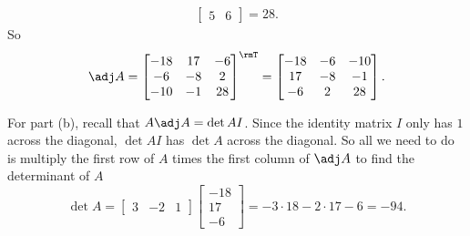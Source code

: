 \begin{questions}
\begin{solution}
\begin{align*}
\begin{bmatrix}
        5&6
      \end{bmatrix}=28.
    \end{align*}
    So
    \[
      \adj A=
      \begin{bmatrix}
        -18&17&-6\\
        -6&-8&2\\
        -10&-1&28\\
      \end{bmatrix}^\rmT
      =
      \begin{bmatrix}
        -18&-6&-10\\
        17&-8&-1\\
        -6&2&28
      \end{bmatrix}.
    \]

    For part (b), recall that $A\adj A=\det A I$. Since the identity matrix
    $I$ only has $1$ across the diagonal, $\det A I$ has $\det A$ across
    the diagonal. So all we need to do is multiply the first row of $A$
    times the first column of $\adj A$ to find the determinant of $A$
    \[
      \det A=\begin{bmatrix}3&-2&1\end{bmatrix}
      \begin{bmatrix}-18\\17\\-6\end{bmatrix}
      =-3\cdot 18-2\cdot 17-6=-94.
    \]
  \end{solution}
\end{questions}
